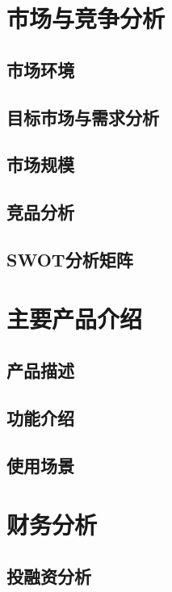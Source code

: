\documentclass[a4paper]{ctexart}
\begin{document}
\section{市场与竞争分析}

\subsection{市场环境}

\subsection{目标市场与需求分析}

\subsection{市场规模}

\subsection{竞品分析}

\subsection{SWOT分析矩阵}

\section{主要产品介绍}

\subsection{产品描述}

\subsection{功能介绍}

\subsection{使用场景}

\section{财务分析}

\subsection{投融资分析}
\end{document}

